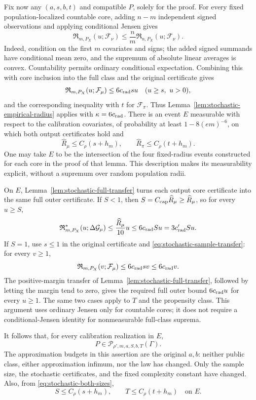 Fix now any $(a,s,b,t)$ and compatible $P$, solely for the proof.
For every fixed population-localized countable core, adding $n-m$
independent signed observations and applying conditional Jensen
gives
\begin{equation}
 \mathfrak R_{m,P_X}(u;\mathcal F_\nu)
 \le\frac nm\mathfrak R_{n,P_X}(u;\mathcal F_\nu).
 \label{eq:stochastic-sample-transfer}
\end{equation}
Indeed, condition on the first $m$ covariates and signs; the added
signed summands have conditional mean zero, and the supremum of
absolute linear averages is convex. Countability permits ordinary
conditional expectation. Combining this with core inclusion into
the full class and the original certificate gives
\[
 \mathfrak R_{m,P_X}(u;\mathcal F_\mu)\le6c_{\rm rad}su
 \quad(u\ge s,\ u>0),
\]
and the corresponding inequality with $t$ for $\mathcal F_\pi$.
Thus Lemma~\ref{lem:stochastic-empirical-radius} applies with
$\kappa=6c_{\rm rad}$. There is an event $E$ measurable with
respect to the calibration covariates, of probability at least
$1-8(em)^{-6}$, on which both output certificates hold and
\begin{equation}
 \widehat R_\mu\le C_\rho(s+h_m),\qquad
 \widehat R_\pi\le C_\rho(t+h_m).
 \label{eq:stochastic-both-sizes}
\end{equation}
One may take $E$ to be the intersection of the four fixed-radius
events constructed for each core in the proof of that lemma. This
description makes its measurability explicit, without a supremum
over random population radii.

On $E$, Lemma~\ref{lem:stochastic-full-transfer} turns each output
core certificate into the same full outer certificate. If $S<1$,
then $S=C_{\rm cap}\widehat R_\mu\ge\widehat R_\mu$, so for
every $u\ge S$,
\[
 \mathfrak R^*_{m,P_X}(u;\Delta\mathcal G_\mu)
 \le\frac{\widehat R_\mu}{10}u
 \le6c_{\rm rad}Su=3c'_{\rm rad}Su.
\]
If $S=1$, use $s\le1$ in the original certificate and
\eqref{eq:stochastic-sample-transfer}: for every $v\ge1$,
\[
 \mathfrak R_{m,P_X}(v;\mathcal F_\mu)
 \le6c_{\rm rad}sv\le6c_{\rm rad}v.
\]
The positive-margin transfer of
Lemma~\ref{lem:stochastic-full-transfer}, followed by letting the
margin tend to zero, gives the required full outer bound
$6c_{\rm rad}u$ for every $u\ge1$. The same two cases apply to
$T$ and the propensity class. This argument uses ordinary Jensen
only for countable cores; it does not require a conditional-Jensen
identity for nonmeasurable full-class suprema.

It follows that, for every calibration realization in $E$,
\begin{equation}
 P\in\mathcal P_{\rho',m,a,S,b,T}(\Gamma).
 \label{eq:stochastic-conditional-certificate}
\end{equation}
The approximation budgets in this assertion are the original $a,b$:
neither public class, either approximation infimum, nor the law has
changed. Only the sample size, the stochastic certificates, and the
fixed complexity constant have changed. Also, from
\eqref{eq:stochastic-both-sizes},
\[
 S\le C_\rho(s+h_m),\qquad T\le C_\rho(t+h_m)
 \quad\text{on }E.
\]

